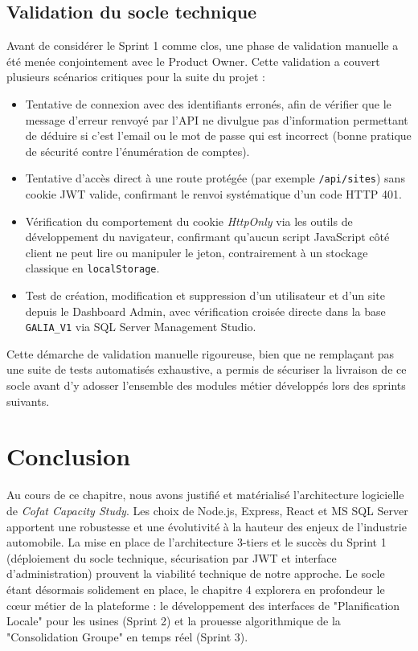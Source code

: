 \subsection{Validation du socle technique}
Avant de considérer le Sprint 1 comme clos, une phase de validation manuelle a été menée conjointement avec le Product Owner. Cette validation a couvert plusieurs scénarios critiques pour la suite du projet :
\begin{itemize}
    \item Tentative de connexion avec des identifiants erronés, afin de vérifier que le message d'erreur renvoyé par l'API ne divulgue pas d'information permettant de déduire si c'est l'email ou le mot de passe qui est incorrect (bonne pratique de sécurité contre l'énumération de comptes).
    \item Tentative d'accès direct à une route protégée (par exemple \texttt{/api/sites}) sans cookie JWT valide, confirmant le renvoi systématique d'un code HTTP 401.
    \item Vérification du comportement du cookie \textit{HttpOnly} via les outils de développement du navigateur, confirmant qu'aucun script JavaScript côté client ne peut lire ou manipuler le jeton, contrairement à un stockage classique en \texttt{localStorage}.
    \item Test de création, modification et suppression d'un utilisateur et d'un site depuis le Dashboard Admin, avec vérification croisée directe dans la base \texttt{GALIA\_V1} via SQL Server Management Studio.
\end{itemize}
Cette démarche de validation manuelle rigoureuse, bien que ne remplaçant pas une suite de tests automatisés exhaustive, a permis de sécuriser la livraison de ce socle avant d'y adosser l'ensemble des modules métier développés lors des sprints suivants.

\section{Conclusion}
Au cours de ce chapitre, nous avons justifié et matérialisé l'architecture logicielle de \textit{Cofat Capacity Study}. Les choix de Node.js, Express, React et MS SQL Server apportent une robustesse et une évolutivité à la hauteur des enjeux de l'industrie automobile. La mise en place de l'architecture 3-tiers et le succès du Sprint 1 (déploiement du socle technique, sécurisation par JWT et interface d'administration) prouvent la viabilité technique de notre approche. 
Le socle étant désormais solidement en place, le chapitre 4 explorera en profondeur le cœur métier de la plateforme : le développement des interfaces de "Planification Locale" pour les usines (Sprint 2) et la prouesse algorithmique de la "Consolidation Groupe" en temps réel (Sprint 3).